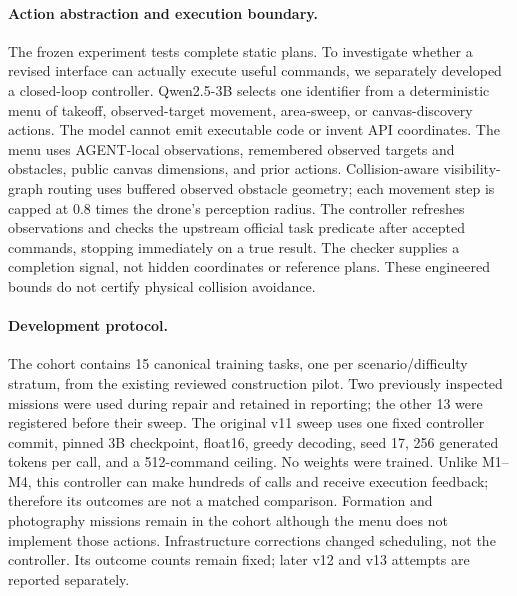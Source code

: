 \documentclass{article}
\begin{document}
\paragraph{Action abstraction and execution boundary.}
The frozen experiment tests complete static plans. To investigate whether a
revised interface can actually execute useful commands, we separately developed
a closed-loop controller. Qwen2.5-3B selects one identifier from a deterministic
menu of takeoff, observed-target movement, area-sweep, or canvas-discovery
actions. The model cannot emit executable code or invent API coordinates.
The menu uses AGENT-local observations, remembered observed targets and
obstacles, public canvas dimensions, and prior actions. Collision-aware
visibility-graph routing uses buffered observed obstacle geometry; each
movement step is capped at $0.8$ times the drone's perception radius. The
controller refreshes observations and checks the upstream official task
predicate after accepted commands, stopping immediately on a true result.
The checker supplies a completion signal, not hidden coordinates or reference
plans. These engineered bounds do not certify physical collision avoidance.

\paragraph{Development protocol.}
The cohort contains 15 canonical training tasks, one per scenario/difficulty
stratum, from the existing reviewed construction pilot. Two previously inspected
missions were used during repair and retained in reporting; the other 13 were
registered before their sweep. The original v11 sweep uses one fixed controller commit,
pinned 3B checkpoint, float16, greedy decoding, seed 17, 256 generated tokens
per call, and a 512-command ceiling. No weights were trained. Unlike M1--M4,
this controller can make hundreds of calls and receive execution feedback;
therefore its outcomes are not a matched comparison. Formation and photography
missions remain in the cohort although the menu does not implement those
actions. Infrastructure corrections changed scheduling, not the controller.
Its outcome counts remain fixed; later v12 and v13 attempts are reported separately.
\end{document}
